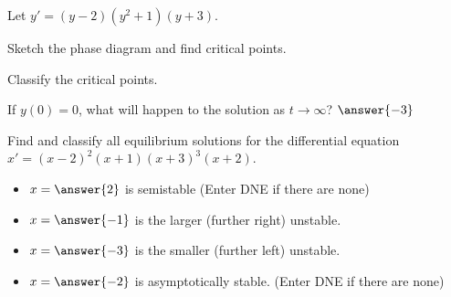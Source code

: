 \documentclass{ximera}
\begin{document}

\begin{exercise}
    Let $y' = (y-2)(y^2 + 1)(y+3)$. 
    \begin{hint}
        Sketch the phase diagram and find critical points.
    \end{hint}
    \begin{hint}
        Classify the critical points.
    \end{hint}
    If $y(0) = 0$, what will happen to the solution as $t \rightarrow \infty$? $\answer{-3}$
\end{exercise}

\begin{exercise}
    Find and classify all equilibrium solutions for the differential equation $x' = (x-2)^2(x+1)(x+3)^3(x+2)$.
    \begin{itemize}
        \item $x = \answer{2}$ is semistable (Enter DNE if there are none)
        \item $x = \answer{-1}$ is the larger (further right) unstable.
        \item $x = \answer{-3}$ is the smaller (further left) unstable.
        \item $x = \answer{-2}$ is asymptotically stable. (Enter DNE if there are none)
    \end{itemize}
\end{exercise}

\end{document}

